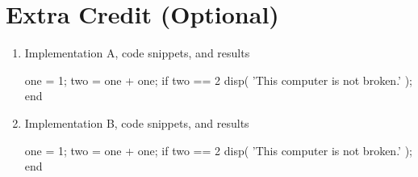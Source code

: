 \section*{Extra Credit (Optional)}
\begin{enumerate}
   
    \item Implementation A, code snippets, and results
        \begin{python}
        one = 1;
        two = one + one;
        if two == 2
            disp( 'This computer is not broken.' );
        end
        \end{python}
    
    \item Implementation B, code snippets, and results
        \begin{python}
        one = 1;
        two = one + one;
        if two == 2
            disp( 'This computer is not broken.' );
        end
        \end{python}
\end{enumerate}


